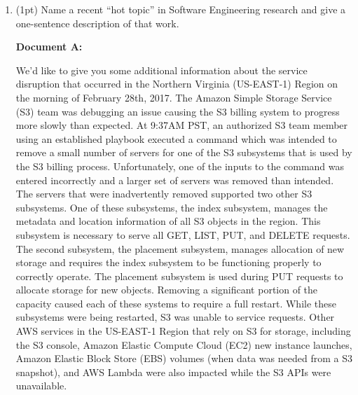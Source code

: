 \documentclass{report}
\newif\ifkey
\newcommand{\answerlong}[1]{\ifkey\color{red}\textbf{#1}\color{black}\else\vspace{0.5in}\fi\xspace}
\newcommand{\ecpts}[1]{\addtocounter{ecpoints}{#1}(#1pt)}
\begin{document}
\begin{spacing}{1.4}
\begin{enumerate}[leftmargin=*]
  \item \ecpts{1} Name a recent ``hot topic'' in Software Engineering research and give a one-sentence description of that work.
    \answerlong{Expected answers are the topics covered in class on 20 April.}
    
    \newpage

    \textbf{Document A:}
    
      We’d like to give you some additional information about the service disruption that occurred in the Northern Virginia (US-EAST-1) Region on the morning of February 28th, 2017. The Amazon Simple Storage Service (S3) team was debugging an issue causing the S3 billing system to progress more slowly than expected. At 9:37AM PST, an authorized S3 team member using an established playbook executed a command which was intended to remove a small number of servers for one of the S3 subsystems that is used by the S3 billing process. Unfortunately, one of the inputs to the command was entered incorrectly and a larger set of servers was removed than intended. The servers that were inadvertently removed supported two other S3 subsystems.  One of these subsystems, the index subsystem, manages the metadata and location information of all S3 objects in the region. This subsystem is necessary to serve all GET, LIST, PUT, and DELETE requests. The second subsystem, the placement subsystem, manages allocation of new storage and requires the index subsystem to be functioning properly to correctly operate. The placement subsystem is used during PUT requests to allocate storage for new objects. Removing a significant portion of the capacity caused each of these systems to require a full restart. While these subsystems were being restarted, S3 was unable to service requests. Other AWS services in the US-EAST-1 Region that rely on S3 for storage, including the S3 console, Amazon Elastic Compute Cloud (EC2) new instance launches, Amazon Elastic Block Store (EBS) volumes (when data was needed from a S3 snapshot), and AWS Lambda were also impacted while the S3 APIs were unavailable.


\end{enumerate}
\end{spacing}
\end{document}
